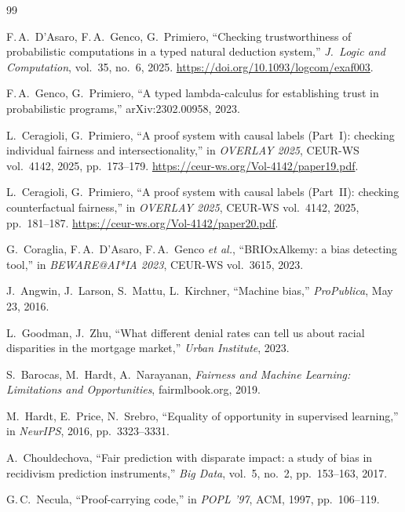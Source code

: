 \documentclass{ceurart}
\begin{document}
\begin{thebibliography}{99}

F.\,A.\ D'Asaro, F.\,A.\ Genco, G.\ Primiero,
``Checking trustworthiness of probabilistic computations in a
typed natural deduction system,''
\emph{J.\ Logic and Computation}, vol.~35, no.~6, 2025.
\url{https://doi.org/10.1093/logcom/exaf003}.

F.\,A.\ Genco, G.\ Primiero,
``A typed lambda-calculus for establishing trust in probabilistic programs,''
arXiv:2302.00958, 2023.

L.\ Ceragioli, G.\ Primiero,
``A proof system with causal labels (Part~I):
checking individual fairness and intersectionality,''
in \emph{OVERLAY 2025}, CEUR-WS vol.~4142, 2025, pp.~173--179.
\url{https://ceur-ws.org/Vol-4142/paper19.pdf}.

L.\ Ceragioli, G.\ Primiero,
``A proof system with causal labels (Part~II):
checking counterfactual fairness,''
in \emph{OVERLAY 2025}, CEUR-WS vol.~4142, 2025, pp.~181--187.
\url{https://ceur-ws.org/Vol-4142/paper20.pdf}.

G.\ Coraglia, F.\,A.\ D'Asaro, F.\,A.\ Genco \emph{et al.},
``BRIOxAlkemy: a bias detecting tool,''
in \emph{BEWARE@AI*IA 2023}, CEUR-WS vol.~3615, 2023.

J.\ Angwin, J.\ Larson, S.\ Mattu, L.\ Kirchner,
``Machine bias,''
\emph{ProPublica}, May 23, 2016.

L.\ Goodman, J.\ Zhu,
``What different denial rates can tell us about racial
disparities in the mortgage market,''
\emph{Urban Institute}, 2023.

S.\ Barocas, M.\ Hardt, A.\ Narayanan,
\emph{Fairness and Machine Learning: Limitations and Opportunities},
fairmlbook.org, 2019.

M.\ Hardt, E.\ Price, N.\ Srebro,
``Equality of opportunity in supervised learning,''
in \emph{NeurIPS}, 2016, pp.~3323--3331.

A.\ Chouldechova,
``Fair prediction with disparate impact: a study of bias in
recidivism prediction instruments,''
\emph{Big Data}, vol.~5, no.~2, pp.~153--163, 2017.

G.\,C.\ Necula,
``Proof-carrying code,''
in \emph{POPL '97}, ACM, 1997, pp.~106--119.


\end{thebibliography}
\end{document}

